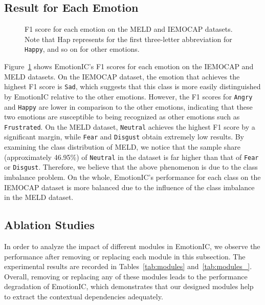 \documentclass{SCIS2019}
\begin{document}
\subsection{Result for Each Emotion}
\begin{figure}[htbp]
\centering
{}
\hfil
{}
\caption{F1 score for each emotion on the MELD and IEMOCAP datasets. Note that Hap represents for the first three-letter abbreviation for \texttt{Happy}, and so on for other emotions.}
\label{fig:eachemotion}
\end{figure}
Figure~\ref{fig:eachemotion} shows EmotionIC's F1 scores for each emotion on the IEMOCAP and MELD datasets. On the IEMOCAP dataset, the emotion that achieves the highest F1 score is \texttt{Sad}, which suggests that this class is more easily distinguished by EmotionIC relative to the other emotions. However, the F1 scores for \texttt{Angry} and \texttt{Happy} are lower in comparison to the other emotions, indicating that these two emotions are susceptible to being recognized as other emotions such as \texttt{Frustrated}. On the MELD dataset, \texttt{Neutral} achieves the highest F1 score by a significant margin, while \texttt{Fear} and \texttt{Disgust} obtain extremely low results. By examining the class distribution of MELD, we notice that the sample share (approximately 46.95\%) of \texttt{Neutral} in the dataset is far higher than that of \texttt{Fear} or \texttt{Disgust}. Therefore, we believe that the above phenomenon is due to the class imbalance problem. On the whole, EmotionIC's performance for each class on the IEMOCAP dataset is more balanced due to the influence of the class imbalance in the MELD dataset.

\subsection{Ablation Studies}
In order to analyze the impact of different modules in EmotionIC, we observe the performance after removing or replacing each module in this subsection. The experimental results are recorded in Tables~\ref{tab:modules} and~\ref{tab:modules_}. Overall, removing or replacing any of these modules leads to the performance degradation of EmotionIC, which demonstrates that our designed modules help to extract the contextual dependencies adequately.
\end{document}

